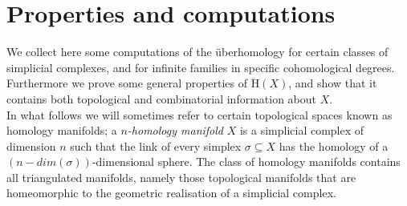 \documentclass[11pt, a4paper, reqno, twoside, makeidx]{amsart}
\theoremstyle{remark}
\theoremstyle{plain}
\theoremstyle{definition}
\newcommand{\uH}{\ddot{\mathrm{H}}}
\begin{document}
\section{Properties and computations}\label{sec:computations}

We collect here some computations of the \"uberhomology for certain classes of simplicial complexes, and for infinite families in  specific cohomological degrees. Furthermore we prove some general properties of $\uH(X)$, and show that it contains both topological and combinatorial information about $X$.\\

In what follows we will sometimes refer to certain topological spaces known as homology manifolds; a \emph{$n$-homology manifold} $X$ is a simplicial complex of dimension $n$ such that the link of every simplex $\sigma \subseteq X$ has the homology of a $(n-dim(\sigma))$-dimensional sphere. The class of homology manifolds contains all triangulated manifolds, namely those topological manifolds that are homeomorphic to the geometric realisation of a simplicial complex.\\
\end{document}
